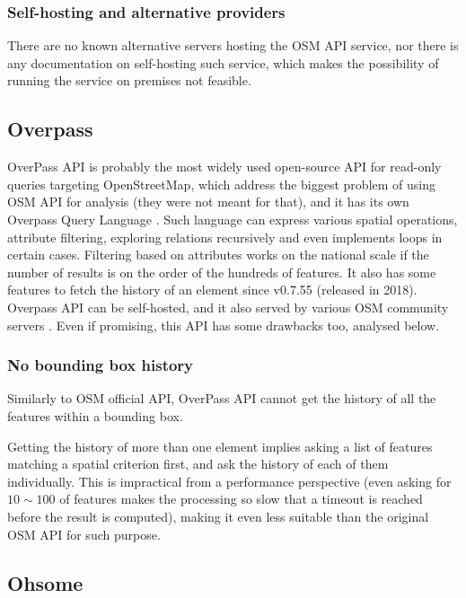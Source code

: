 \documentclass{Configuration_Files/PoliMi3i_thesis}
\begin{document}
\subsubsection{Self-hosting and alternative providers}

There are no known alternative servers hosting the OSM API service, nor there is any documentation on self-hosting such service, which makes the possibility of running the service on premises not feasible.

\subsection{Overpass}

OverPass API \cite{OverpassAPIOpenStreetMap} is probably the most widely used open-source API for read-only queries targeting OpenStreetMap, which address the biggest problem of using OSM API for analysis (they were not meant for that), and it has its own Overpass Query Language \cite{OverpassAPILanguage}. Such language can express various spatial operations, attribute filtering, exploring relations recursively and even implements loops in certain cases. Filtering based on attributes works on the national scale if the number of results is on the order of the hundreds of features.
It also has some features to fetch the history of an element since v0.7.55 \cite{SlicedTimeSpace} (released in 2018).
Overpass API can be self-hosted, and it also served by various OSM community servers \cite{OverpassAPIOpenStreetMap}.
Even if promising, this API has some drawbacks too, analysed below.

\subsubsection{No bounding box history}

Similarly to OSM official API, OverPass API cannot get the history of all the features within a bounding box.

Getting the history of more than one element implies asking a list of features matching a spatial criterion first, and ask the history of each of them individually. This is impractical from a performance perspective (even asking for $ 10 \sim 100 $ of features makes the processing so slow that a timeout is reached before the result is computed), making it even less suitable than the original OSM API for such purpose.

\subsection{Ohsome}
\end{document}
